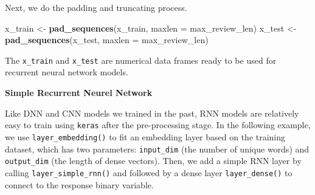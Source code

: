 \documentclass[12pt,]{krantz}
\makeatletter
\newenvironment{Shaded}{\begin{snugshade}}{\end{snugshade}}
\newcommand{\DataTypeTok}[1]{\textcolor[rgb]{0.27,0.27,0.27}{#1}}
\newcommand{\DecValTok}[1]{\textcolor[rgb]{0.06,0.06,0.06}{#1}}
\newcommand{\FloatTok}[1]{\textcolor[rgb]{0.06,0.06,0.06}{#1}}
\newcommand{\KeywordTok}[1]{\textcolor[rgb]{0.27,0.27,0.27}{\textbf{#1}}}
\newcommand{\NormalTok}[1]{#1}
\newcommand{\OperatorTok}[1]{\textcolor[rgb]{0.43,0.43,0.43}{\textbf{#1}}}
\newcommand{\StringTok}[1]{\textcolor[rgb]{0.5,0.5,0.5}{#1}}
\newenvironment{kframe}{%
\medskip{}
\setlength{\fboxsep}{.8em}
 \def\at@end@of@kframe{}%
 \ifinner\ifhmode%
  \def\at@end@of@kframe{\end{minipage}}%
  \begin{minipage}{\columnwidth}%
 \fi\fi%
 \def\FrameCommand##1{\hskip\@totalleftmargin \hskip-\fboxsep
 \colorbox{shadecolor}{##1}\hskip-\fboxsep
     \hskip-\linewidth \hskip-\@totalleftmargin \hskip\columnwidth}%
 \MakeFramed {\advance\hsize-\width
   \@totalleftmargin\z@ \linewidth\hsize
   \@setminipage}}%
 {\par\unskip\endMakeFramed%
 \at@end@of@kframe}
\renewenvironment{Shaded}{\begin{kframe}}{\end{kframe}}
\makeatother
\begin{document}
\begin{Shaded}
\end{Shaded}

Next, we do the padding and truncating process.

\begin{Shaded}
\begin{Highlighting}[]
\NormalTok{x_train <-}\StringTok{ }\KeywordTok{pad_sequences}\NormalTok{(x_train, }\DataTypeTok{maxlen =}\NormalTok{ max_review_len)}
\NormalTok{x_test <-}\StringTok{ }\KeywordTok{pad_sequences}\NormalTok{(x_test, }\DataTypeTok{maxlen =}\NormalTok{ max_review_len)}
\end{Highlighting}
\end{Shaded}

The \texttt{x\_train} and \texttt{x\_test} are numerical data frames ready to be used for recurrent neural network models.

\textbf{Simple Recurrent Neurel Network}

Like DNN and CNN models we trained in the past, RNN models are relatively easy to train using \texttt{keras} after the pre-processing stage. In the following example, we use \texttt{layer\_embedding()} to fit an embedding layer based on the training dataset, which has two parameters: \texttt{input\_dim} (the number of unique words) and \texttt{output\_dim} (the length of dense vectors). Then, we add a simple RNN layer by calling \texttt{layer\_simple\_rnn()} and followed by a dense layer \texttt{layer\_dense()} to connect to the response binary variable.

\begin{Shaded}
\end{Shaded}
\end{document}
